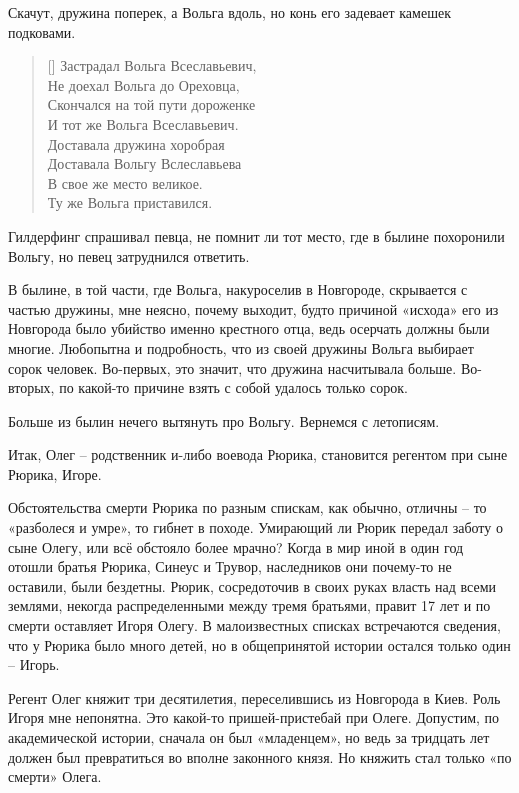 Скачут, дружина поперек, а Вольга вдоль, но конь его задевает камешек подковами.

\settowidth{\versewidth}{Скончался на той пути дороженке} 
\begin{verse}[\versewidth]
Застрадал Вольга Всеславьевич,\\
Не доехал Вольга до Ореховца,\\
Скончался на той пути дороженке\\
И тот же Вольга Всеславьевич.\\
Доставала дружина хоробрая\\
Доставала Вольгу Вслеславьева\\
В свое же место великое.\\
Ту же Вольга приставился.
\end{verse}

Гилдерфинг спрашивал певца, не помнит ли тот место, где в былине похоронили Вольгу, но певец затруднился ответить.

В былине, в той части, где Вольга, накуроселив в Новгороде, скрывается с частью дружины, мне неясно, почему выходит, будто причиной «исхода» его из Новгорода было убийство именно крестного отца, ведь осерчать должны были многие. Любопытна и подробность, что из своей дружины Вольга выбирает сорок человек. Во-первых, это значит, что дружина насчитывала больше. Во-вторых, по какой-то причине взять с собой удалось только сорок.

Больше из былин нечего вытянуть про Вольгу. Вернемся с летописям.

Итак, Олег – родственник и-либо воевода Рюрика, становится регентом при сыне Рюрика, Игоре.

Обстоятельства смерти Рюрика по разным спискам, как обычно, отличны – то «разболеся и умре», то гибнет в походе. Умирающий ли Рюрик передал заботу о сыне Олегу, или всё обстояло более мрачно? Когда в мир иной в один год отошли братья Рюрика, Синеус и Трувор, наследников они почему-то не оставили, были бездетны. Рюрик, сосредоточив в своих руках власть над всеми землями, некогда распределенными между тремя братьями, правит 17 лет и по смерти оставляет Игоря Олегу. В малоизвестных списках встречаются сведения, что у Рюрика было много детей, но в общепринятой истории остался только один – Игорь. 

Регент Олег княжит три десятилетия, переселившись из Новгорода в Киев. Роль Игоря мне непонятна. Это какой-то пришей-пристебай при Олеге. Допустим, по академической истории, сначала он был «младенцем», но ведь за тридцать лет должен был превратиться во вполне законного князя. Но княжить стал только «по смерти» Олега.

